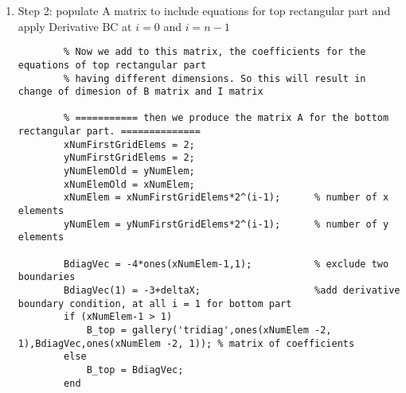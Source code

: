 \documentclass{article}
\begin{document}
\begin{enumerate}
\begin{lstlisting}
            A = B_bottom;                               %Initialize A matrix
            for k=1:yNumElem-2
                A = blkdiag(A, B_bottom);               %populate A matrix with B matrix as diagonal
            end
            % Now loop through the A matrix to add I matrix wherever necessary
            for k= 1: (xNumElem - 1)*(yNumElem-1)
                if (k + xNumElem -1 <= size(A, 2))      % leave the boundary, i=n and j=m
                    A(k, k + xNumElem -1) = 1;
                end
                if (k > (xNumElem - 1))                 % leave the boundary, i=0 and j=0
                    A(k, k -( xNumElem -1)) = 1;
                end
            end
            % Now the vector A has the coefficients of $$\phi$$s inside the bottom rectangle.
                % ====================================================================
    \end{lstlisting}
    \item Step 2: populate A matrix to include equations for top rectangular part and apply Derivative BC at $i=0$ and $i=n-1$
    \begin{lstlisting}
        % Now we add to this matrix, the coefficients for the equations of top rectangular part
        % having different dimensions. So this will result in change of dimesion of B matrix and I matrix

        % =========== then we produce the matrix A for the bottom rectangular part. ==============
        xNumFirstGridElems = 2;
        yNumFirstGridElems = 2;
        yNumElemOld = yNumElem;
        xNumElemOld = xNumElem;
        xNumElem = xNumFirstGridElems*2^(i-1);      % number of x elements
        yNumElem = yNumFirstGridElems*2^(i-1);      % number of y elements

        BdiagVec = -4*ones(xNumElem-1,1);           % exclude two boundaries
        BdiagVec(1) = -3+deltaX;                    %add derivative boundary condition, at all i = 1 for bottom part
        if (xNumElem-1 > 1)
            B_top = gallery('tridiag',ones(xNumElem -2, 1),BdiagVec,ones(xNumElem -2, 1)); % matrix of coefficients
        else
            B_top = BdiagVec;
        end


\end{lstlisting}
\end{enumerate}
\end{document}
